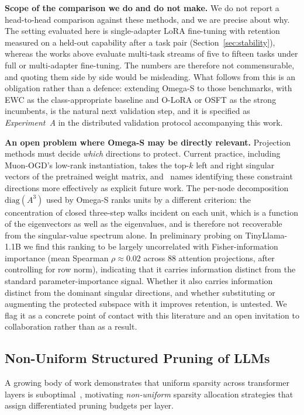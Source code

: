 \documentclass[11pt,a4paper]{article}
\begin{document}
\textbf{Scope of the comparison we do and do not make.} We do not report a
head-to-head comparison against these methods, and we are precise about
why. The setting evaluated here is single-adapter LoRA fine-tuning with
retention measured on a held-out capability after a task pair
(Section~\ref{sec:stability}), whereas the works above evaluate multi-task
streams of five to fifteen tasks under full or multi-adapter fine-tuning.
The numbers are therefore not commensurable, and quoting them side by side
would be misleading. What follows from this is an obligation rather than a
defence: extending Omega-S to those benchmarks, with EWC as the
class-appropriate baseline and O-LoRA or OSFT as the strong incumbents, is
the natural next validation step, and it is specified as
\emph{Experiment~A} in the distributed validation protocol accompanying
this work.

\textbf{An open problem where Omega-S may be directly relevant.}
Projection methods must decide \emph{which} directions to protect.
Current practice, including Muon-OGD's low-rank instantiation, takes the
top-$k$ left and right singular vectors of the pretrained weight matrix,
and~\cite{lu2026muonogd} names identifying these constraint directions more
effectively as explicit future work. The per-node
decomposition $\mathrm{diag}(A^3)$ used by Omega-S ranks units by a
different criterion: the concentration of closed three-step walks incident
on each unit, which is a function of the eigenvectors as well as the
eigenvalues, and is therefore not recoverable from the singular-value
spectrum alone. In preliminary probing on TinyLlama-1.1B we find this
ranking to be largely uncorrelated with Fisher-information importance
(mean Spearman $\rho \approx 0.02$ across 88 attention projections, after
controlling for row norm), indicating that it carries information distinct
from the standard parameter-importance signal. Whether it also carries
information distinct from the dominant singular directions, and whether
substituting or augmenting the protected subspace with it improves
retention, is untested. We flag it as a concrete point of contact with this
literature and an open invitation to collaboration rather than as a result.

\subsection{Non-Uniform Structured Pruning of LLMs}

A growing body of work demonstrates that uniform sparsity across transformer
layers is suboptimal~\cite{yin2024owl}, motivating \emph{non-uniform}
sparsity allocation strategies that assign differentiated pruning budgets
per layer.
\end{document}
